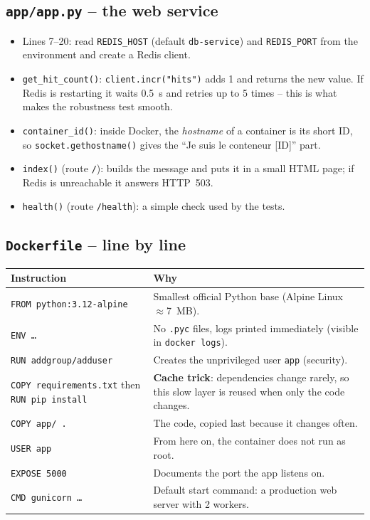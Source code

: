 \documentclass[11pt,a4paper]{article}
\begin{document}
\subsection{\texttt{app/app.py} -- the web service}

\begin{itemize}[leftmargin=1.3em]
\item Lines 7--20: read \texttt{REDIS\_HOST} (default \texttt{db-service}) and \texttt{REDIS\_PORT} from the environment and create a Redis client.
\item \texttt{get\_hit\_count()}: \texttt{client.incr("hits")} adds 1 and returns the new value. If Redis is restarting it waits 0.5~s and retries up to 5 times -- this is what makes the robustness test smooth.
\item \texttt{container\_id()}: inside Docker, the \emph{hostname} of a container is its short ID, so \texttt{socket.gethostname()} gives the ``Je suis le conteneur [ID]'' part.
\item \texttt{index()} (route \texttt{/}): builds the message and puts it in a small HTML page; if Redis is unreachable it answers HTTP~503.
\item \texttt{health()} (route \texttt{/health}): a simple check used by the tests.
\end{itemize}

\subsection{\texttt{Dockerfile} -- line by line}

\begin{center}\small
\begin{tabularx}{\textwidth}{lX}
\toprule
\textbf{Instruction} & \textbf{Why}\\
\midrule
\texttt{FROM python:3.12-alpine} & Smallest official Python base (Alpine Linux $\approx$7~MB).\\
\texttt{ENV \ldots} & No \texttt{.pyc} files, logs printed immediately (visible in \texttt{docker logs}).\\
\texttt{RUN addgroup/adduser} & Creates the unprivileged user \texttt{app} (security).\\
\texttt{COPY requirements.txt} then \texttt{RUN pip install} & \textbf{Cache trick}: dependencies change rarely, so this slow layer is reused when only the code changes.\\
\texttt{COPY app/ .} & The code, copied last because it changes often.\\
\texttt{USER app} & From here on, the container does not run as root.\\
\texttt{EXPOSE 5000} & Documents the port the app listens on.\\
\texttt{CMD gunicorn \ldots} & Default start command: a production web server with 2 workers.\\
\bottomrule
\end{tabularx}
\end{center}
\end{document}
